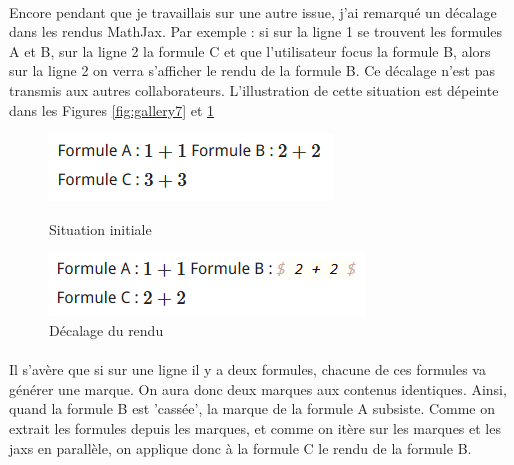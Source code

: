 \documentclass[12pt]{article}
\begin{document}
\paragraph{}
Encore pendant que je travaillais sur une autre issue, j'ai remarqué un décalage dans les rendus MathJax. Par exemple : si sur la ligne 1 se trouvent les formules A et B, sur la ligne 2 la formule C et que l'utilisateur focus la formule B, alors sur la ligne 2 on verra s'afficher le rendu de la formule B. Ce décalage n'est pas transmis aux autres collaborateurs. L'illustration de cette situation est dépeinte dans les Figures \ref{fig:gallery7} et \ref{fig:gallery8}
\begin{figure}[H]
  \begin{minipage}[c]{.46\linewidth}
    \centering
    \includegraphics[scale=0.75]{gallery/doublon1.png}
    \caption {\label{fig:gallery7}Situation initiale}
  \end{minipage}
  \hfill
  \begin{minipage}[c]{.46\linewidth}
    \centering
    \includegraphics[scale=0.75]{gallery/doublon2.png}
    \caption {\label{fig:gallery8}Décalage du rendu}
  \end{minipage}
\end{figure}
\paragraph{}
Il s'avère que si sur une ligne il y a deux formules, chacune de ces formules va générer une marque. On aura donc deux marques aux contenus identiques. Ainsi, quand la formule B est 'cassée', la marque de la formule A subsiste. Comme on extrait les formules depuis les marques, et comme on itère sur les marques et les jaxs en parallèle, on applique donc à la formule C le rendu de la formule B.
\end{document}
